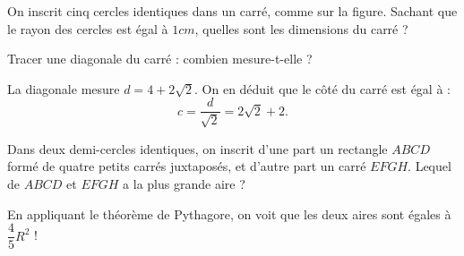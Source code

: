 

\begin{exo}
On inscrit cinq cercles identiques dans un carré, comme sur la figure.
Sachant que le rayon des cercles est égal à $1cm$, quelles sont les dimensions du carré ?
\begin{center}
\end{center}
\begin{hint}
Tracer une diagonale du carré : combien mesure-t-elle ?
\end{hint}
\begin{sol}
La diagonale mesure $d=4+2\sqrt 2$.
On en déduit que le côté du carré est égal à  :
\[ c = \frac{d}{\sqrt 2} = 2\sqrt 2+2.\]
\end{sol}
\end{exo}


\begin{exo}
Dans deux demi-cercles identiques, on inscrit d'une part un rectangle $ABCD$ formé de quatre petits carrés juxtaposés, et d'autre part un carré $EFGH$.
Lequel de $ABCD$ et $EFGH$ a la plus grande aire ?

\begin{center}
\hspace{1cm}
\end{center}
\begin{sol}
En appliquant le théorème de Pythagore, on voit que les deux aires sont égales  à $\dfrac 45 R^2$ !
\end{sol}

\end{exo}







